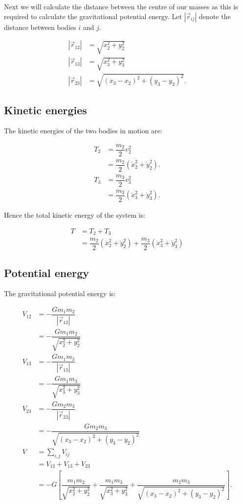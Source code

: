 \documentclass[12pt,a4paper,portrait]{article}
\begin{document}
	Next we will calculate the distance between the centre of our masses as this is required to calculate the gravitational potential energy. Let $|\vec{r}_{ij}|$ denote the distance between bodies $i$ and $j$. 
	
	\begin{align*}
		\left|\vec{r}_{12}\right| &= \sqrt{x_2^2+y_2^2} \\
		\left|\vec{r}_{13}\right| &= \sqrt{x_3^2+y_3^2} \\
		\left|\vec{r}_{23}\right| &= \sqrt{(x_3-x_2)^2+(y_3-y_2)^2}.
	\end{align*}
	
	\subsection{Kinetic energies}
	
	The kinetic energies of the two bodies in motion are:
	
	\begin{align*}
		T_2 &= \dfrac{m_2}{2} v_2^2 \\
		&= \dfrac{m_2}{2} \left(\dot{x}_2^2 + \dot{y}_2^2\right). \\
		T_3 &= \dfrac{m_3}{2}v_3^2 \\
		&= \dfrac{m_3}{2} \left(\dot{x}_3^2 + \dot{y}_3^2\right).
	\end{align*}
	
	Hence the total kinetic energy of the system is:
	
	\begin{align*}
		T &= T_2 + T_3 \\
		&= \dfrac{m_2}{2} \left(\dot{x}_2^2 + \dot{y}_2^2\right) + \dfrac{m_3}{2} \left(\dot{x}_3^2 + \dot{y}_3^2\right)
	\end{align*}
	
	\subsection{Potential energy}
	The gravitational potential energy is:
	
	\begin{align*}
		V_{12} &= -\dfrac{Gm_1m_2}{|\vec{r}_{12}|} \\
		&= -\dfrac{Gm_1m_2}{\sqrt{x_2^2+y_2^2}}\\
		V_{13} &= -\dfrac{Gm_1m_3}{|\vec{r}_{13}|} \\
		&= -\dfrac{Gm_1 m_3}{\sqrt{x_3^2+y_3^2}} \\
		V_{23} &= -\dfrac{Gm_2m_3}{|\vec{r}_{23}|} \\
		&= -\dfrac{Gm_2 m_3}{\sqrt{(x_3-x_2)^2+(y_3-y_2)^2}} \\
		V &= \sum_{i,j} V_{ij} \\
		&= V_{12}+V_{13} +V_{23} \\
		&= -G\left[\dfrac{m_1m_2}{\sqrt{x_2^2+y_2^2}} + \dfrac{m_1 m_3}{\sqrt{x_3^2+y_3^2}} + \dfrac{m_2 m_3}{\sqrt{(x_3-x_2)^2+(y_3-y_2)^2}}\right].
	\end{align*}
	
\end{document}
